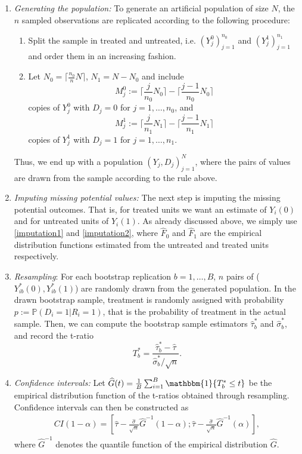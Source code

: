 \documentclass[aodsor,preprint]{imsart}
\numberwithin{equation}{section}
\theoremstyle{plain}
\newcommand{\ind}{\mathbbm{1}} %
\begin{document}
\begin{enumerate}
	
	\item \textit{Generating the population:} To generate an artificial population of size $N$, the $n$ sampled observations are replicated according to the following procedure:
	\begin{enumerate}
		\item Split the sample in treated and untreated, i.e. $(Y_j^0)_{j=1}^{n_0}$ and $(Y_j^1)_{j=1}^{n_1}$ and order them in an increasing fashion.
		\item Let $N_0 = \lceil \frac{n_0}{n} N \rceil$, $N_1 = N - N_0$ and include 
		$$M_j^0 := \lceil \frac{j}{n_0} N_0 \rceil - \lceil \frac{j-1}{n_0} N_0 \rceil$$
		copies of $Y_j^0$ with $D_j = 0$ for $j = 1, \ldots, n_0$, and 
		$$M_j^1 := \lceil \frac{j}{n_1} N_1 \rceil - \lceil \frac{j-1}{n_1} N_1 \rceil$$
		copies of $Y_j^1$ with $D_j = 1$ for $j = 1, \ldots, n_1$.
	\end{enumerate}
	Thus, we end up with a population $(Y_j, D_j)_{j=1}^N$, where the pairs of values are drawn from the sample according to the rule above. 
	
	\item \textit{Imputing missing potential values:} The next step is imputing the missing potential outcomes. That is, for treated units we want an estimate of $Y_i(0)$ and for untreated units of $Y_i(1)$. As already discussed above, we simply use \ref{imputation1} and \ref{imputation2}, where $\widehat{F}_0$ and $\widehat{F}_1$ are the empirical distribution functions estimated from the untreated and treated units respectively.
	
	\item \textit{Resampling}: For each bootstrap replication $b = 1,\ldots, B$, $n$ pairs of ($Y_{ib}^*(0), Y_{ib}^*(1)$) are randomly drawn from the generated population. In the drawn bootstrap sample, treatment is randomly assigned with probability $p:= \mathbb{P}(D_i = 1 | R_i = 1)$, that is the probability of treatment in the actual sample. Then, we can compute the bootstrap sample estimators $\widehat{\tau}_b^*$ and $\widehat{\sigma}_b^*$, and record the t-ratio
	$$
	T_b^* = \frac{\widehat{\tau}_b^* - \widehat{\tau}}{\widehat{\sigma}_b^* / \sqrt{n}}.
	$$
	
	\item \textit{Confidence intervals:} Let $\widehat{G}(t) = \frac{1}{B} \sum_{i=1}^{B} \ind\{T_b^* \leq t\}$ be the empirical distribution function of the t-ratios obtained through resampling. Confidence intervals can then be constructed as 
	\begin{align} \label{CI}
		CI(1-\alpha) = \left[ \widehat{\tau} - \frac{\widehat{\sigma}}{\sqrt{n}} \widehat{G}^{-1}(1-\alpha); \widehat{\tau} - \frac{\widehat{\sigma}}{\sqrt{n}} \widehat{G}^{-1}(\alpha)  \right],
	\end{align}
	where $\widehat{G}^{-1}$ denotes the quantile function of the empirical distribution $\widehat{G}$.
	
\end{enumerate}
\end{document}
